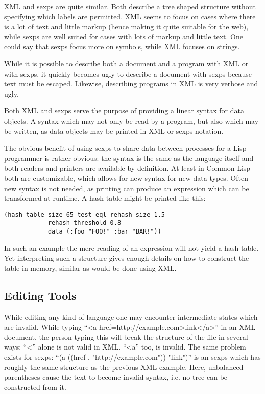 \documentclass[a4paper,10pt,twoside]{report}
\newcommand{\cl}{Common Lisp}
\begin{document}
XML and sexps are quite similar.  Both describe a tree shaped structure without
specifying which labels are permitted.  XML seems to focus on cases where there
is a lot of text and little markup (hence making it quite suitable for the web),
while sexps are well suited for cases with lots of markup and little text.  One
could say that sexps focus more on symbols, while XML focuses on strings.

While it is possible to describe both a document and a program with XML or with
sexps, it quickly becomes ugly to describe a document with sexps because text
must be escaped.  Likewise, describing programs in XML is very verbose and ugly.

Both XML and sexps serve the purpose of providing a linear syntax for data
objects.  A syntax which may not only be read by a program, but also which may
be written, as data objects may be printed in XML or sexps notation.

The obvious benefit of using sexps to share data between processes for a Lisp
programmer is rather obvious: the syntax is the same as the language itself and
both readers and printers are available by definition.  At least in \cl{} both
are customizable, which allows for new syntax for new data types.  Often new
syntax is not needed, as printing can produce an expression which can be
transformed at runtime.  A hash table might be printed like this:

\pagebreak

\begin{lstlisting}[style=lispinline]
(hash-table size 65 test eql rehash-size 1.5
            rehash-threshold 0.8
            data (:foo "FOO!" :bar "BAR!"))
\end{lstlisting}

In such an example the mere reading of an expression will not yield a hash
table.  Yet interpreting such a structure gives enough details on how to
construct the table in memory, similar as would be done using XML.

\subsection{Editing Tools}
\label{subsec:edit-tools}

While editing any kind of language one may encounter intermediate states which
are invalid.  While typing ``<a href=http://example.com>link</a>'' in an XML
document, the person typing this will break the structure of the file in several
ways:  ``<'' alone is not valid in XML.  ``<a'' too, is invalid.  The same
problem exists for sexps: ``(a ((href . "http://example.com")) "link")'' is an
sexps which has roughly the same structure as the previous XML example.  Here,
unbalanced parentheses cause the text to become invalid syntax, i.e. no tree can
be constructed from it.
\end{document}
